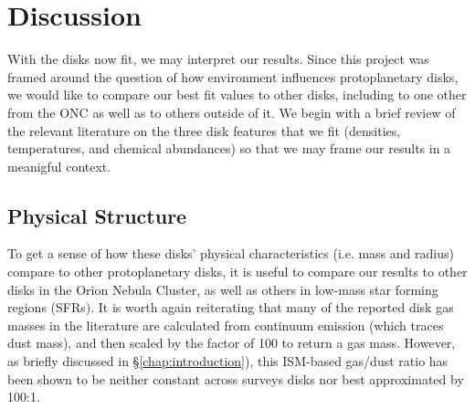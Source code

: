 \chapter{Discussion}
\label{chap:discussion}



With the disks now fit, we may interpret our results. Since this project was framed around the question of how environment influences protoplanetary disks, we would like to compare our best fit values to other disks, including to one other from the ONC \citep{Factor2017} as well as to others outside of it. We begin with a brief review of the relevant literature on the three disk features that we fit (densities, temperatures, and chemical abundances) so that we may frame our results in a meanigful context.







\section{Physical Structure}





To get a sense of how these disks' physical characteristics (i.e. mass and radius) compare to other protoplanetary disks, it is useful to compare our results to other disks in the Orion Nebula Cluster, as well as others in low-mass star forming regions (SFRs). It is worth again reiterating that many of the reported disk gas masses in the literature \citep[as well as the value we use here from][]{Williams2014} are calculated from continuum emission (which traces dust mass), and then scaled by the factor of 100 to return a gas mass. However, as briefly discussed in \S\ref{chap:introduction}), this ISM-based gas/dust ratio has been shown to be neither constant across surveys disks nor best approximated by 100:1.


